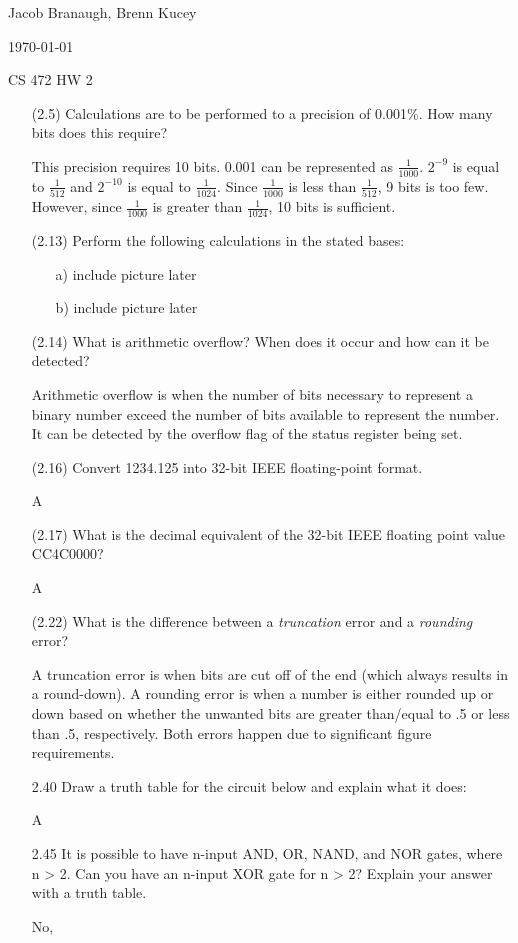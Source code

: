 \documentclass[letterpaper,10pt,titlepage]{article}
\def\name{Jacob Branaugh, Brenn Kucey}
\begin{document}
\hfill \name

\hfill \today

\hfill CS 472 HW 2

\begin{enumerate}
\item[(2.5)] Calculations are to be performed to a precision of 0.001\%. How many bits
	does this require?
  \item[\textbullet] This precision requires 10 bits. 0.001 can be represented as
	$\frac{1}{1000}$. $2^{-9}$ is equal to $\frac{1}{512}$ and $2^{-10}$ is equal to
	$\frac{1}{1024}$. Since $\frac{1}{1000}$ is less than $\frac{1}{512}$, 9 bits is
	too few. However, since $\frac{1}{1000}$ is greater than $\frac{1}{1024}$, 10
	bits is sufficient.

\item[(2.13)] Perform the following calculations in the stated bases:
  \begin{enumerate}
  \item[a)] include picture later
  \item[b)] include picture later
  \end{enumerate}

\item[(2.14)] What is arithmetic overflow? When does it occur and how can it be detected?
  \item[\textbullet] Arithmetic overflow is when the number of bits necessary to represent
	  a binary number exceed the number of bits available to represent the number.
	  It can be detected by the overflow flag of the status register being set.

\item[(2.16)] Convert 1234.125 into 32-bit IEEE floating-point format.
  \item[\textbullet] A

\item[(2.17)] What is the decimal equivalent of the 32-bit IEEE floating point value
	CC4C0000?
  \item[\textbullet] A

\item[(2.22)] What is the difference between a \textit{truncation} error and a
	\textit{rounding} error?
  \item[\textbullet] A truncation error is when bits are cut off of the end (which always
	results in a round-down). A rounding error is when a number is either rounded up
	or down based on whether the unwanted bits are greater than/equal to .5 or less
	than .5, respectively. Both errors happen due to significant figure requirements.

\item[2.40] Draw a truth table for the circuit below and explain what it does:
  \item[\textbullet] A

\item[2.45] It is possible to have n-input AND, OR, NAND, and NOR gates, where n > 2. Can
	you have an n-input XOR gate for n > 2? Explain your answer with a truth table.
  \item[\textbullet] No, 

\end{enumerate}
\end{document}
